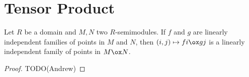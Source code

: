 \section{Tensor Product}


\begin{lemma}
  \label{0-tensor-lin-indep}
  \uses{}
  \leanok

  Let $R$ be a domain and $M, N$ two $R$-semimodules.
  If $f$ and $g$ are linearly independent families of points in $M$ and $N$, then $(i, j) \mapsto f i \ox g j$ is a linearly independent family of points in $M \ox N$.
\end{lemma}
\begin{proof}
  \uses{}
  \leanok

  TODO(Andrew)
\end{proof}
